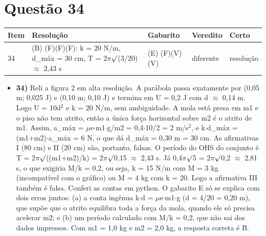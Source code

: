\documentclass{article}%
\begin{document}
\section*{Questão 34}%
\begin{longtable}{@{}p{} p{} p{} p{} p{}@{}}\toprule Item & Resolução & Gabarito & Veredito & Certo \\ \midrule
34 & (B) (F)(F)(F): k = 20 N/m, d\_máx = 30 cm, T = 2$\pi$$\surd$(3/20) $\approx$ 2,43 s & (E) (F)(V)(V) & diferente & resolução \\
\bottomrule\end{longtable}%
\begin{itemize}%
\item%
\textbf{34)} Reli a figura 2 em alta resolução. A parábola passa exatamente por (0,05 m; 0,025 J) e (0,10 m; 0,10 J) e termina em U = 0,2 J com d $\approx$ 0,14 m. Logo U = 10d$^2$ e k = 20 N/m, sem ambiguidade. A mola está presa em m1 e o piso não tem atrito, então a única força horizontal sobre m2 é o atrito de m1. Assim, a\_máx = $\mu$e$\cdot$m1$\cdot$g/m2 = 0,4$\cdot$10/2 = 2 m/s$^2$, e k$\cdot$d\_máx = (m1+m2)$\cdot$a\_máx = 6 N, o que dá d\_máx = 0,30 m = 30 cm. As afirmativas I (80 cm) e II (20 cm) são, portanto, falsas. O período do OHS do conjunto é T = 2$\pi$$\surd$((m1+m2)/k) = 2$\pi$$\surd$0,15 $\approx$ 2,43 s. Já 0,4$\pi$$\surd$5 = 2$\pi$$\surd$0,2 $\approx$ 2,81 s, o que exigiria M/k = 0,2, ou seja, k = 15 N/m com M = 3 kg (incompatível com o gráfico) ou M = 4 kg com k = 20. Logo a afirmativa III também é falsa. Conferi as contas em python. O gabarito E só se explica com dois erros juntos: (a) a conta ingênua k$\cdot$d = $\mu$e$\cdot$m1$\cdot$g (d = 4/20 = 0,20 m), que supõe que o atrito equilibra toda a força da mola, quando ele só precisa acelerar m2; e (b) um período calculado com M/k = 0,2, que não sai dos dados impressos. Com m1 = 1,0 kg e m2 = 2,0 kg, a resposta correta é B.%
\end{itemize}%
\end{document}
